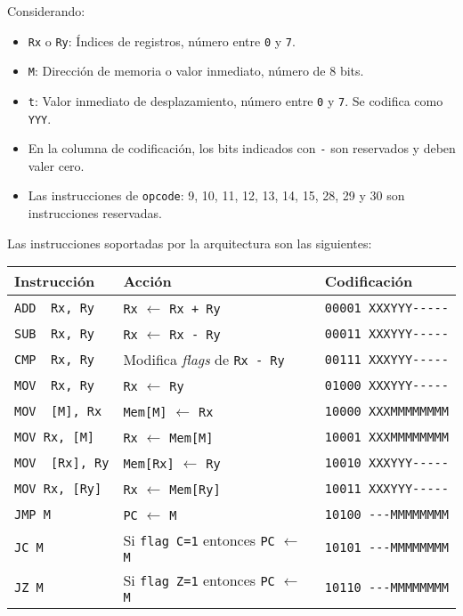 \documentclass[12pt,twoside]{templates/unerthesis}
\providecommand{\tightlist}{%
  \setlength{\itemsep}{0pt}\setlength{\parskip}{0pt}}
\begin{document}
Considerando:

\begin{itemize}
\tightlist
\item
  \texttt{Rx} o \texttt{Ry}: Índices de registros, número entre \texttt{0} y \texttt{7}.
\item
  \texttt{M}: Dirección de memoria o valor inmediato, número de 8 bits.
\item
  \texttt{t}: Valor inmediato de desplazamiento, número entre \texttt{0} y \texttt{7}. Se codifica como \texttt{YYY}.
\item
  En la columna de codificación, los bits indicados con \texttt{-} son reservados y deben valer cero.
\item
  Las instrucciones de \texttt{opcode}: 9, 10, 11, 12, 13, 14, 15, 28, 29 y 30 son instrucciones reservadas.
\end{itemize}

Las instrucciones soportadas por la arquitectura son las siguientes:

\begin{longtable}[]{@{}lll@{}}
\toprule
Instrucción & Acción & Codificación\tabularnewline
\midrule
\endhead
\texttt{ADD\ \ Rx,\ Ry} & \texttt{Rx} \(\leftarrow\) \texttt{Rx\ +\ Ry} & \texttt{00001\ XXXYYY-\/-\/-\/-\/-}\tabularnewline
\texttt{SUB\ \ Rx,\ Ry} & \texttt{Rx} \(\leftarrow\) \texttt{Rx\ -\ Ry} & \texttt{00011\ XXXYYY-\/-\/-\/-\/-}\tabularnewline
\texttt{CMP\ \ Rx,\ Ry} & Modifica \emph{flags} de \texttt{Rx\ -\ Ry} & \texttt{00111\ XXXYYY-\/-\/-\/-\/-}\tabularnewline
\texttt{MOV\ \ Rx,\ Ry} & \texttt{Rx} \(\leftarrow\) \texttt{Ry} & \texttt{01000\ XXXYYY-\/-\/-\/-\/-}\tabularnewline
\texttt{MOV\ \ {[}M{]},\ Rx} & \texttt{Mem{[}M{]}} \(\leftarrow\) \texttt{Rx} & \texttt{10000\ XXXMMMMMMMM}\tabularnewline
\texttt{MOV\ Rx,\ {[}M{]}} & \texttt{Rx} \(\leftarrow\) \texttt{Mem{[}M{]}} & \texttt{10001\ XXXMMMMMMMM}\tabularnewline
\texttt{MOV\ \ {[}Rx{]},\ Ry} & \texttt{Mem{[}Rx{]}} \(\leftarrow\) \texttt{Ry} & \texttt{10010\ XXXYYY-\/-\/-\/-\/-}\tabularnewline
\texttt{MOV\ Rx,\ {[}Ry{]}} & \texttt{Rx} \(\leftarrow\) \texttt{Mem{[}Ry{]}} & \texttt{10011\ XXXYYY-\/-\/-\/-\/-}\tabularnewline
\texttt{JMP\ M} & \texttt{PC} \(\leftarrow\) \texttt{M} & \texttt{10100\ -\/-\/-MMMMMMMM}\tabularnewline
\texttt{JC\ M} & Si \texttt{flag\ C=1} entonces \texttt{PC} \(\leftarrow\) \texttt{M} & \texttt{10101\ -\/-\/-MMMMMMMM}\tabularnewline
\texttt{JZ\ M} & Si \texttt{flag\ Z=1} entonces \texttt{PC} \(\leftarrow\) \texttt{M} & \texttt{10110\ -\/-\/-MMMMMMMM}\tabularnewline
\bottomrule
\end{longtable}
\end{document}
